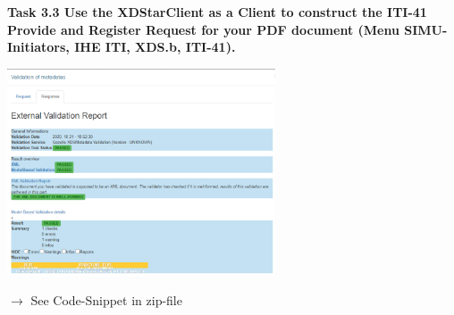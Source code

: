 \documentclass{report}
\newenvironment{Figure}
	{\par\medskip\noindent\minipage{\linewidth}}
	{\endminipage\par\medskip}
\begin{document}
\textbf{Task 3.3 Use the XDStarClient as a Client to construct the ITI-41 Provide and Register Request for your PDF document (Menu SIMU-Initiators, IHE ITI, XDS.b, ITI-41).}
\begin{Figure}
   \centering
    \includegraphics[width=300px]{img/Task33.png}
        \label{fig:Result Task 3.3}
    \end{Figure}
$\rightarrow$ See Code-Snippet in zip-file\\
\end{document}
